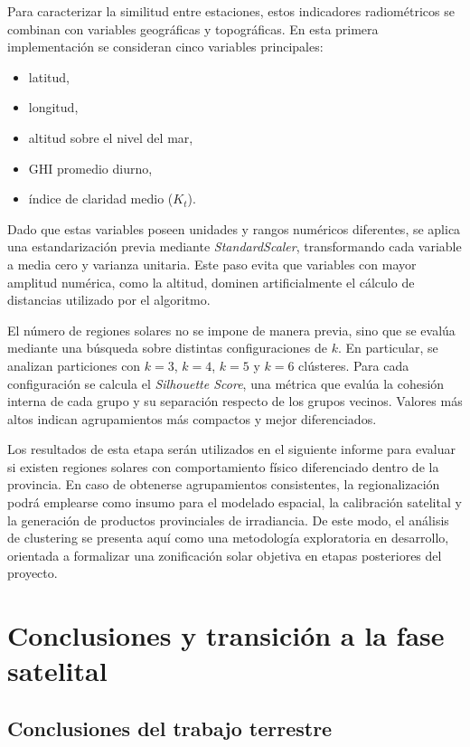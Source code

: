 \documentclass[../main.tex]{subfiles}
\begin{document}
Para caracterizar la similitud entre estaciones, estos indicadores radiométricos se combinan con variables geográficas y topográficas. En esta primera implementación se consideran cinco variables principales:

\begin{itemize}
    \item latitud,
    \item longitud,
    \item altitud sobre el nivel del mar,
    \item GHI promedio diurno,
    \item índice de claridad medio ($K_t$).
\end{itemize}

Dado que estas variables poseen unidades y rangos numéricos diferentes, se aplica una estandarización previa mediante \textit{StandardScaler}, transformando cada variable a media cero y varianza unitaria. Este paso evita que variables con mayor amplitud numérica, como la altitud, dominen artificialmente el cálculo de distancias utilizado por el algoritmo.

El número de regiones solares no se impone de manera previa, sino que se evalúa mediante una búsqueda sobre distintas configuraciones de $k$. En particular, se analizan particiones con $k=3$, $k=4$, $k=5$ y $k=6$ clústeres. Para cada configuración se calcula el \textit{Silhouette Score}, una métrica que evalúa la cohesión interna de cada grupo y su separación respecto de los grupos vecinos. Valores más altos indican agrupamientos más compactos y mejor diferenciados.

Los resultados de esta etapa serán utilizados en el siguiente informe para evaluar si existen regiones solares con comportamiento físico diferenciado dentro de la provincia. En caso de obtenerse agrupamientos consistentes, la regionalización podrá emplearse como insumo para el modelado espacial, la calibración satelital y la generación de productos provinciales de irradiancia. De este modo, el análisis de clustering se presenta aquí como una metodología exploratoria en desarrollo, orientada a formalizar una zonificación solar objetiva en etapas posteriores del proyecto.

\section{Conclusiones y transición a la fase satelital}

\subsection{Conclusiones del trabajo terrestre}
\end{document}
